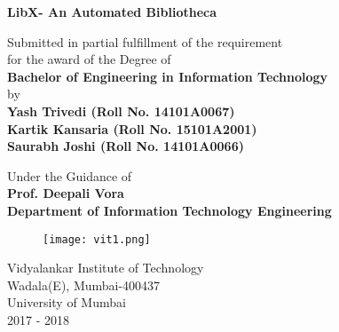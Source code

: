\documentclass[a4paper,12pt]{report}
\begin{document}
\begin{titlepage}

\vspace*{0.25cm}
{\centering \onehalfspacing
{\Large\textbf {LibX- An Automated Bibliotheca}}\\
\vspace{1.5cm}
\onehalfspacing


Submitted in partial fulfillment of the requirement\\
for the award of the Degree of\\\vspace{1cm}
{\large\textbf {Bachelor of Engineering in Information Technology }}\\
by\\
{\large \textbf {Yash Trivedi (Roll No. 14101A0067)}}\\
{\large \textbf {Kartik Kansaria (Roll No. 15101A2001)}}\\
{\large \textbf {Saurabh Joshi (Roll No. 14101A0066)}}\\
\vspace{2cm}

Under the Guidance of\\
\vspace{0.50cm}
\hspace{.05cm} {\large \textbf {Prof. Deepali Vora}}\\
{\large \textbf {Department of Information Technology Engineering}}\\

\begin{figure}[h]
\centering
\texttt{[image: vit1.png]}
\end{figure}

\begin{comment}
\vspace{1cm}
\hspace{.05cm}
\hspace{.03cm}
hspace was 7.25 initially for year 2015-17
\end{comment}
\onehalfspacing

Vidyalankar Institute of Technology\\
Wadala(E), Mumbai-400437\\
University of Mumbai\\
\hspace{5.9cm}2017 - 2018}\\
\end{titlepage}


\pagebreak
\end{document}
